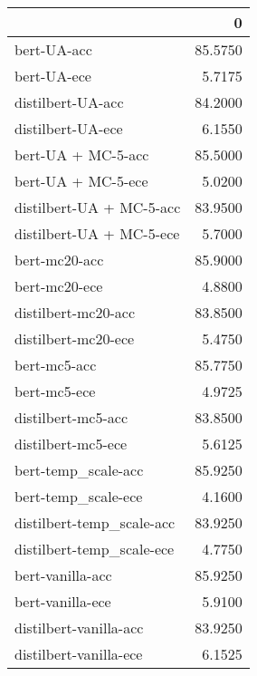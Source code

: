 \begin{tabular}{lr}
\toprule
{} &        0 \\
\midrule
bert-UA-acc               &  85.5750 \\
bert-UA-ece               &   5.7175 \\
distilbert-UA-acc         &  84.2000 \\
distilbert-UA-ece         &   6.1550 \\
bert-UA + MC-5-acc        &  85.5000 \\
bert-UA + MC-5-ece        &   5.0200 \\
distilbert-UA + MC-5-acc  &  83.9500 \\
distilbert-UA + MC-5-ece  &   5.7000 \\
bert-mc20-acc             &  85.9000 \\
bert-mc20-ece             &   4.8800 \\
distilbert-mc20-acc       &  83.8500 \\
distilbert-mc20-ece       &   5.4750 \\
bert-mc5-acc              &  85.7750 \\
bert-mc5-ece              &   4.9725 \\
distilbert-mc5-acc        &  83.8500 \\
distilbert-mc5-ece        &   5.6125 \\
bert-temp\_scale-acc       &  85.9250 \\
bert-temp\_scale-ece       &   4.1600 \\
distilbert-temp\_scale-acc &  83.9250 \\
distilbert-temp\_scale-ece &   4.7750 \\
bert-vanilla-acc          &  85.9250 \\
bert-vanilla-ece          &   5.9100 \\
distilbert-vanilla-acc    &  83.9250 \\
distilbert-vanilla-ece    &   6.1525 \\
\bottomrule
\end{tabular}
